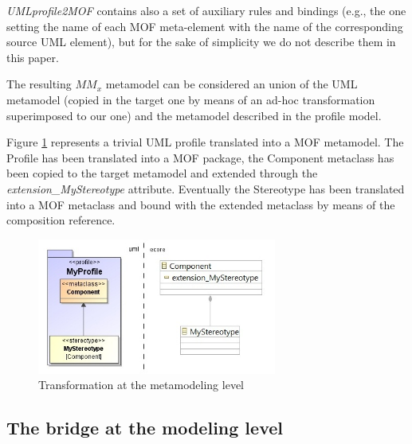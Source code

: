 \textit{UMLprofile2MOF} contains also a set of auxiliary rules and bindings (e.g., the one setting the name of each MOF meta-element with the name of the corresponding source UML element), but for the sake of simplicity we do not describe them in this paper.

The resulting $MM_x$ metamodel can be considered an union of the UML metamodel (copied in the target one by means of an ad-hoc transformation superimposed to our one) and the metamodel described in the profile model. 

Figure \ref{fig:metamodelingExample} represents a trivial UML profile translated into a MOF metamodel. The Profile has been translated into a MOF package, the Component metaclass has been copied to the target metamodel and extended through the \textit{extension\_MyStereotype} attribute. Eventually the Stereotype has been translated into a MOF metaclass and bound with the extended metaclass by means of the composition reference.
%
\begin{figure}[htbp]
	\centering
		\includegraphics[width=0.70\textwidth]{figures/metamodelingExample.jpg}
	\caption{Transformation at the metamodeling level}
	\label{fig:metamodelingExample}
\end{figure}



\subsection{The bridge at the modeling level}\label{sec:modeLevel}

